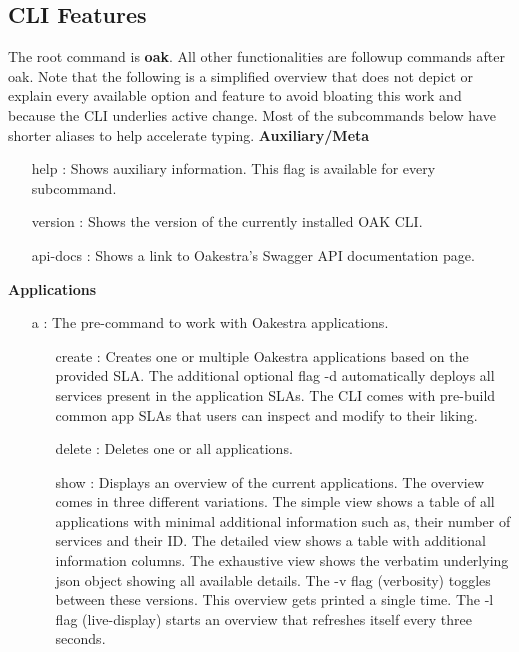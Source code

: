 \subsection{CLI Features}

The root command is \textbf{oak}.
All other functionalities are followup commands after oak.
Note that the following is a simplified overview that does not depict or explain every available option and feature to avoid bloating this work and because the CLI underlies active change.
Most of the subcommands below have shorter aliases to help accelerate typing.
\vspace{5mm}
\newline
\textbf{Auxiliary/Meta}
\begin{itemize}
    \item [help]:
        Shows auxiliary information.
        This flag is available for every subcommand.
    \item [version]:
        Shows the version of the currently installed OAK CLI.
    \item [api-docs]:
        Shows a link to Oakestra's Swagger API documentation page.
\end{itemize}
\vspace{5mm}
\textbf{Applications}
\begin{itemize}
    \item [a]:
        The pre-command to work with Oakestra applications.
        \begin{itemize}
            \item [create]:
                Creates one or multiple Oakestra applications based on the provided SLA.
                The additional optional flag -d automatically deploys all services present in the application SLAs.
                The CLI comes with pre-build common app SLAs that users can inspect and modify to their liking.
            \item [delete]:
                Deletes one or all applications.
            \item [show]:
                Displays an overview of the current applications.
                The overview comes in three different variations.
                The simple view shows a table of all applications with minimal additional information such as, their number of services and their ID.
                The detailed view shows a table with additional information columns.
                The exhaustive view shows the verbatim underlying json object showing all available details.
                The -v flag (verbosity) toggles between these versions.
                This overview gets printed a single time.
                The -l flag (live-display) starts an overview that refreshes itself every three seconds.
        \end{itemize}
\end{itemize}
